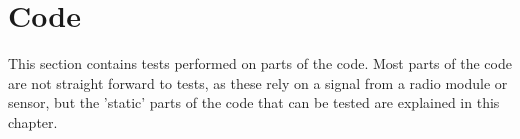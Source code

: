 \section{Code}
This section contains tests performed on parts of the code. Most parts of the code are not straight forward to tests, as these rely on a signal from a radio module or sensor, but the 'static' parts of the code that can be tested are explained in this chapter.

 